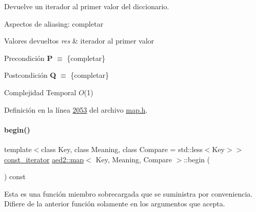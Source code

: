 Devuelve un iterador al primer valor del diccionario. 

\begin{DoxyParagraph}{Aspectos de aliasing\+:}
completar
\end{DoxyParagraph}

\begin{DoxyRetVals}{Valores devueltos}
{\em res} & iterador al primer valor\\
\hline
\end{DoxyRetVals}
\begin{DoxyPrecond}{Precondición}
{\bfseries P} $\equiv$ \{completar\} 
\end{DoxyPrecond}
\begin{DoxyPostcond}{Postcondición}
{\bfseries Q} $\equiv$ \{completar\}
\end{DoxyPostcond}

\begin{DoxyDescription}
\item[Complejidad Temporal]$O$(1)
\end{DoxyDescription}

Definición en la línea \hyperlink{map_8h_source_l02053}{2053} del archivo \hyperlink{map_8h_source}{map.\+h}.

\mbox{\label{classaed2_1_1map_af3b1818c2b44e37221cc3b131768555b_af3b1818c2b44e37221cc3b131768555b}} 
\paragraph{\texorpdfstring{begin()}{begin()}\hspace{0.1cm}{\footnotesize\ttfamily [2/2]}}
{\footnotesize\ttfamily template$<$class Key, class Meaning, class Compare = std\+::less$<$\+Key$>$$>$ \\
\hyperlink{classaed2_1_1map_1_1const__iterator}{const\+\_\+iterator} \hyperlink{classaed2_1_1map}{aed2\+::map}$<$ Key, Meaning, Compare $>$\+::begin (\begin{DoxyParamCaption}{ }\end{DoxyParamCaption}) const\hspace{0.3cm}{\ttfamily [inline]}}

Esta es una función miembro sobrecargada que se suministra por conveniencia. Difiere de la anterior función solamente en los argumentos que acepta. 

